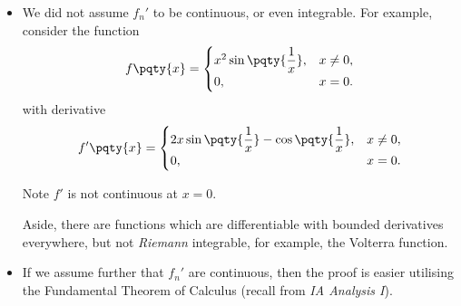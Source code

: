 \begin{remarks}
    \begin{itemize}
        \item We did not assume \(f_n'\) to be continuous, or even integrable. For example, consider the function
        \[
            f\pqty{x} = \begin{cases}
                x^2 \sin \pqty{\dfrac{1}{x}}, & x \neq 0, \\
                0, & x = 0.
            \end{cases}
        \]
        with derivative
        \[
            f'\pqty{x} = \begin{cases}
                2x \sin \pqty{\dfrac{1}{x}} - \cos\pqty{\dfrac{1}{x}}, & x \neq 0, \\
                0, & x = 0.
            \end{cases}
        \]

        Note \(f'\) is not continuous at \(x = 0\).

        Aside, there are functions which are differentiable with bounded derivatives everywhere, but not \emph{Riemann} integrable, for example, the Volterra function.
        \item If we assume further that \(f_n'\) are continuous, then the proof is easier utilising the Fundamental Theorem of Calculus (recall from \textit{IA Analysis I}).
    \end{itemize}
\end{remarks}

